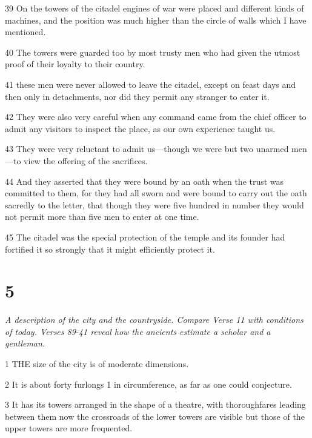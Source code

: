\par 39 On the towers of the citadel engines of war were placed and different kinds of machines, and the position was much higher than the circle of walls which I have mentioned.

\par 40 The towers were guarded too by most trusty men who had given the utmost proof of their loyalty to their country.

\par 41 these men were never allowed to leave the citadel, except on feast days and then only in detachments, nor did they permit any stranger to enter it.

\par 42 They were also very careful when any command came from the chief officer to admit any visitors to inspect the place, as our own experience taught us.

\par 43 They were very reluctant to admit us—though we were but two unarmed men—to view the offering of the sacrifices.

\par 44 And they asserted that they were bound by an oath when the trust was committed to them, for they had all sworn and were bound to carry out the oath sacredly to the letter, that though they were five hundred in number they would not permit more than five men to enter at one time.

\par 45 The citadel was the special protection of the temple and its founder had fortified it so strongly that it might efficiently protect it.

\chapter{5}

\par \textit{A description of the city and the countryside. Compare Verse 11 with conditions of today. Verses 89-41 reveal how the ancients estimate a scholar and a gentleman.}

\par 1 THE size of the city is of moderate dimensions.

\par 2 It is about forty furlongs 1 in circumference, as far as one could conjecture.

\par 3 It has its towers arranged in the shape of a theatre, with thoroughfares leading between them now the crossroads of the lower towers are visible but those of the upper towers are more frequented.

